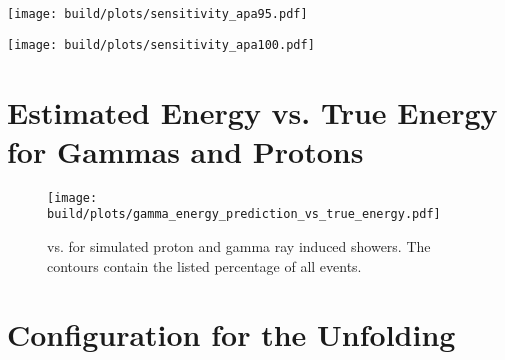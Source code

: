 \begin{center}
  \texttt{[image: build/plots/sensitivity\_apa95.pdf]}
  \label{fig:sensitivity-95}
\end{center}
\begin{center}
  \texttt{[image: build/plots/sensitivity\_apa100.pdf]}
  \label{fig:sensitivity-100}
\end{center}


\section{Estimated Energy vs. True Energy for Gammas and Protons}\label{apx:est-vs-true}
\begin{figure}
  \centering
  \texttt{[image: build/plots/gamma\_energy\_prediction\_vs\_true\_energy.pdf]}
  \caption{%
    \Eest{}  vs. \Etrue{} for simulated proton and gamma ray induced showers.
    The contours contain the listed percentage of all events.
  }
\end{figure}


\section{Configuration for the Unfolding}\label{apx:unfolding-config}

